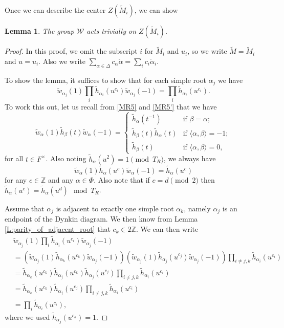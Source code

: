 \documentclass[10pt, letterpaper]{amsart}
\theoremstyle{plain}
\newtheorem{Lem}[equation]{Lemma}
\theoremstyle{definition}
\numberwithin{equation}{section}
\newcommand{\Z}{\mathbb{Z}}
\newcommand{\wt}{\tilde{w}}
\newcommand{\htt}{\tilde{h}}
\newcommand{\alphac}{{\check{\alpha}}}
\newcommand{\Mt}{\widetilde{M}}
\newcommand{\Wcal}{\mathcal{W}}
\newcommand{\la}{\langle}
\newcommand{\ra}{\rangle}
\begin{document}
Once we can describe the center $Z(\Mt_i)$, we can show
\begin{Lem}
The group $\Wcal$ acts trivially on $Z(\Mt_i)$.
\end{Lem}
\begin{proof}
In this proof, we omit the subscript $i$ for $\Mt_i$ and $u_i$, so we write $\Mt=\Mt_i$ and $u=u_i$. Also we write $\sum_{\alpha\in\Delta}c_\alpha\alphac=\sum_{i}c_i\alphac_i$. 

To show the lemma, it suffices to show that for each simple root $\alpha_j$ we have
\[
\wt_{\alpha_j}(1) \prod_{i}\htt_{\alpha_i}(u^{c_i}) \wt_{\alpha_j}(-1)=\prod_{i}\htt_{\alpha_i}(u^{c_i}).
\]
To work this out, let us recall from \eqref{MR5} and \eqref{MR5'} that we have
\[
\wt_{\alpha}(1)\htt_{\beta}(t)\wt_{\alpha}(-1)=\begin{cases}\htt_{\alpha}(t^{-1})&\text{if $\beta=\alpha$};\\
\htt_{\beta}(t)\htt_{\alpha}(t)&\text{if $\la\alpha,\beta\ra=-1$};\\
\htt_{\beta}(t)&\text{if $\la\alpha, \beta\ra=0$},
\end{cases}
\]
for all $t\in F^\times$. Also noting $\htt_\alpha(u^2)=1\pmod{T_{R}}$, we always have
\[
\wt_{\alpha}(1)\htt_{\alpha}(u^c)\wt_{\alpha}(-1)=\htt_{\alpha}(u^c)
\]
for any $c\in\Z$ and any $\alpha\in\Phi$. Also note that if $c=d\pmod{2}$ then $\htt_{\alpha}(u^c)=\htt_{\alpha}(u^d)\mod{T_R}$.

Assume that $\alpha_j$ is adjacent to exactly one simple root $\alpha_k$, namely $\alpha_j$ is an endpoint of the Dynkin diagram. We then know from Lemma \ref{L:parity_of_adjacent_root} that $c_k\in 2\Z$. We can then write
\begin{align*}
&\wt_{\alpha_j}(1) \prod_{i}\htt_{\alpha_i}(u^{c_i}) \wt_{\alpha_j}(-1)\\
&=\left(\wt_{\alpha_j}(1)\htt_{\alpha_k}(u^{c_k})\wt_{\alpha_j}(-1)\right)\left(\wt_{\alpha_j}(1)\htt_{\alpha_j}(u^{c_j})\wt_{\alpha_j}(-1)\right) \prod_{i\neq j, k}\htt_{\alpha_i}(u^{c_i})\\
&=\htt_{\alpha_k}(u^{c_k})\htt_{\alpha_j}(u^{c_k})\htt_{\alpha_j}(u^{c_j})\prod_{i\neq j, k}\htt_{\alpha_i}(u^{c_i})\\
&=\htt_{\alpha_k}(u^{c_k})\htt_{\alpha_j}(u^{c_j})\prod_{i\neq j, k}\htt_{\alpha_i}(u^{c_i})\\
&=\prod_{i}\htt_{\alpha_i}(u^{c_i}),
\end{align*}
where we used $\htt_{\alpha_j}(u^{c_k})=1$.


\end{proof}
\end{document}
